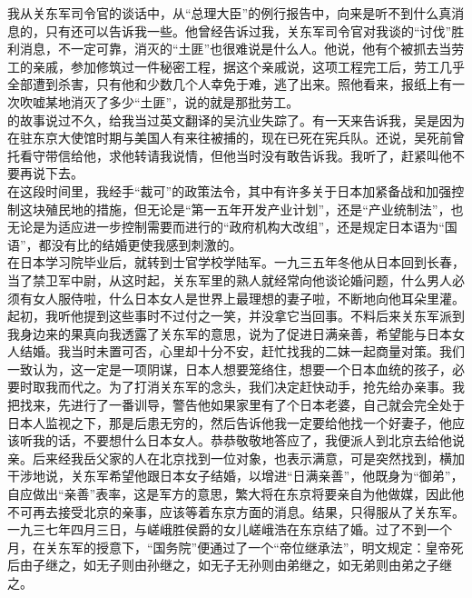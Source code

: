 我从关东军司令官的谈话中，从“总理大臣”的例行报告中，向来是听不到什么真消息的，只有还可以告诉我一些。他曾经告诉过我，关东军司令官对我谈的“讨伐”胜利消息，不一定可靠，消灭的“土匪”也很难说是什么人。他说，他有个被抓去当劳工的亲戚，参加修筑过一件秘密工程，据这个亲戚说，这项工程完工后，劳工几乎全部遭到杀害，只有他和少数几个人幸免于难，逃了出来。照他看来，报纸上有一次吹嘘某地消灭了多少“土匪”，说的就是那批劳工。\\

的故事说过不久，给我当过英文翻译的吴沆业失踪了。有一天来告诉我，吴是因为在驻东京大使馆时期与美国人有来往被捕的，现在已死在宪兵队。还说，吴死前曾托看守带信给他，求他转请我说情，但他当时没有敢告诉我。我听了，赶紧叫他不要再说下去。\\

在这段时间里，我经手“裁可”的政策法令，其中有许多关于日本加紧备战和加强控制这块殖民地的措施，但无论是“第一五年开发产业计划”，还是“产业统制法”，也无论是为适应进一步控制需要而进行的“政府机构大改组”，还是规定日本语为“国语”，都没有比的结婚更使我感到刺激的。\\

在日本学习院毕业后，就转到士官学校学陆军。一九三五年冬他从日本回到长春，当了禁卫军中尉，从这时起，关东军里的熟人就经常向他谈论婚问题，什么男人必须有女人服侍啦，什么日本女人是世界上最理想的妻子啦，不断地向他耳朵里灌。起初，我听他提到这些事时不过付之一笑，并没拿它当回事。不料后来关东军派到我身边来的果真向我透露了关东军的意思，说为了促进日满亲善，希望能与日本女人结婚。我当时未置可否，心里却十分不安，赶忙找我的二妹一起商量对策。我们一致认为，这一定是一项阴谋，日本人想要笼络住，想要一个日本血统的孩子，必要时取我而代之。为了打消关东军的念头，我们决定赶快动手，抢先给办亲事。我把找来，先进行了一番训导，警告他如果家里有了个日本老婆，自己就会完全处于日本人监视之下，那是后患无穷的，然后告诉他我一定要给他找一个好妻子，他应该听我的话，不要想什么日本女人。恭恭敬敬地答应了，我便派人到北京去给他说亲。后来经我岳父家的人在北京找到一位对象，也表示满意，可是突然找到，横加干涉地说，关东军希望他跟日本女子结婚，以增进“日满亲善”，他既身为“御弟”，自应做出“亲善”表率，这是军方的意思，繁大将在东京将要亲自为他做媒，因此他不可再去接受北京的亲事，应该等着东京方面的消息。结果，只得服从了关东军。\\

一九三七年四月三日，与嵯峨胜侯爵的女儿嵯峨浩在东京结了婚。过了不到一个月，在关东军的授意下，“国务院”便通过了一个“帝位继承法”，明文规定：皇帝死后由子继之，如无子则由孙继之，如无子无孙则由弟继之，如无弟则由弟之子继之。\\

